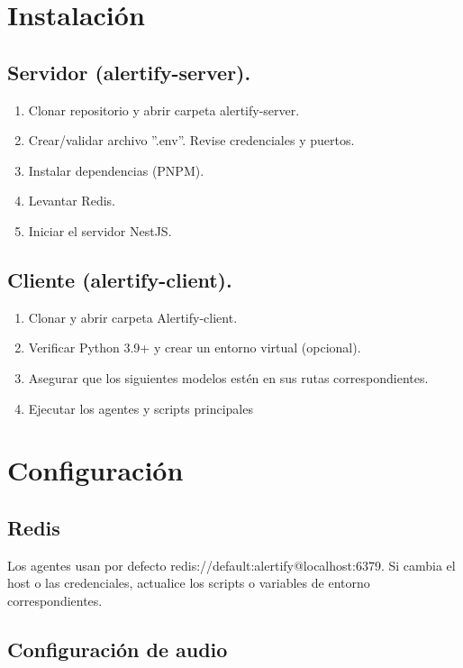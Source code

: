 \section*{Instalación}

\subsection*{Servidor (alertify-server).}

\begin{enumerate}
  \item Clonar repositorio y abrir carpeta alertify-server.
  \item Crear/validar archivo ''.env''. Revise credenciales y puertos.
  \item Instalar dependencias (PNPM).
  \item Levantar Redis.
  \item Iniciar el servidor NestJS.
\end{enumerate}

\subsection*{Cliente (alertify-client).}

\begin{enumerate}
  \item Clonar y abrir carpeta Alertify-client.
  \item Verificar Python 3.9+ y crear un entorno virtual (opcional).
  \item Asegurar que los siguientes modelos estén en sus rutas correspondientes.
  \item Ejecutar los agentes y scripts principales
\end{enumerate}

\section*{Configuración}

\subsection*{Redis}

Los agentes usan por defecto redis://default:alertify@localhost:6379. Si cambia el host o las credenciales, actualice los scripts o variables de entorno correspondientes.

\subsection*{Configuración de audio}

